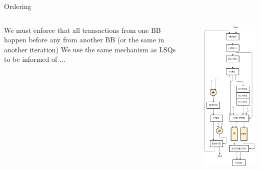 \documentclass{beamer}
\begin{document}
\begin{frame}{Ordering}
\begin{columns}
    \begin{column}{0.45\textwidth}
    We must enforce that all transactions from one BB happen before any from another BB (or the same in another iteration) \newline \newline
    We use the same mechanism as LSQs to be informed of ...
    \end{column}
    \begin{column}{0.1\textwidth}
    \end{column}
    \begin{column}{0.45\textwidth}
      \includegraphics[scale=0.25]{blocking_shared_solution.png}
    \end{column}
  \end{columns}
\end{frame}
\end{document}
